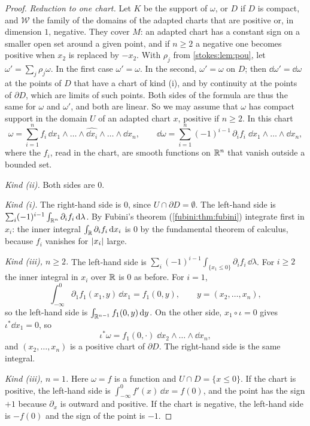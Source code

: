 \begin{notechapter}
\begin{proof}
\emph{Reduction to one chart.} Let $K$ be the support of $\omega$, or
$D$ if $D$ is compact, and $\mathcal W$ the family of the domains of
the adapted charts that are positive or, in dimension $1$, negative.
They cover $M$: an adapted chart has a constant sign on a smaller open
set around a given point, and if $n\geq2$ a negative one becomes
positive when $x_2$ is replaced by $-x_2$. With $\rho_j$ from
\cref{stokes:lem:pou}, let
$\omega' = \sum_j\rho_j\omega$. In the first case $\omega' = \omega$.
In the second, $\omega' = \omega$ on $D$; then
$\dd\omega' = \dd\omega$ at the points of $D$ that have a chart of kind
(i), and by continuity at the points of $\partial D$, which are limits
of such points. Both sides of the formula are thus the same for
$\omega$ and $\omega'$, and both are linear. So we may assume that
$\omega$ has compact support in the domain $U$ of an adapted chart
$x$, positive if $n\geq2$. In this chart
\[
  \omega = \sum_{i=1}^nf_i\,
  \dd x_1\wedge\dots\wedge\widehat{\dd x_i}\wedge\dots\wedge\dd x_n ,
  \qquad
  \dd\omega = \sum_{i=1}^n(-1)^{i-1}\,\partial_if_i\;
  \dd x_1\wedge\dots\wedge\dd x_n ,
\]
where the $f_i$, read in the chart, are smooth functions on $\mathbb{R}^n$ that
vanish outside a bounded set.

\emph{Kind (ii).} Both sides are $0$.

\emph{Kind (i).} The right-hand side is $0$, since
$U\cap\partial D = \emptyset$. The left-hand side is
$\sum_i(-1)^{i-1}\int_{\mathbb{R}^n}\partial_if_i\,\mathrm{d}\lambda$. By Fubini's
theorem (\cref{fubini:thm:fubini}) integrate first in $x_i$: the inner
integral $\int_{\mathbb{R}}\partial_if_i\,\mathrm{d} x_i$ is $0$ by the fundamental
theorem of calculus, because $f_i$ vanishes for $\left|x_i\right|$ large.

\emph{Kind (iii), $n\geq2$.} The left-hand side is
$\sum_i(-1)^{i-1}\int_{\{x_1\leq0\}}\partial_if_i\,\dd\lambda$. For
$i\geq2$ the inner integral in $x_i$ over $\mathbb{R}$ is $0$ as before. For
$i = 1$,
\[
  \int_{-\infty}^0\partial_1f_1(x_1, y)\,\dd x_1 = f_1(0, y) ,
  \qquad y = (x_2,\dots,x_n) ,
\]
so the left-hand side is $\int_{\mathbb{R}^{n-1}}f_1(0, y)\,\mathrm{d} y$. On the
other side, $x_1\circ\iota = 0$ gives $\iota^*\dd x_1 = 0$, so
\[
  \iota^*\omega = f_1(0, \cdot)\;\dd x_2\wedge\dots\wedge\dd x_n ,
\]
and $(x_2,\dots,x_n)$ is a positive chart of $\partial D$. The
right-hand side is the same integral.

\emph{Kind (iii), $n = 1$.} Here $\omega = f$ is a function and
$U\cap D = \{x\leq0\}$. If the chart is positive, the left-hand side is
$\int_{-\infty}^0f'(x)\,\dd x = f(0)$, and the point has the sign $+1$
because $\partial_x$ is outward and positive. If the chart is negative,
the left-hand side is $-f(0)$ and the sign of the point is $-1$.
\end{proof}


\end{notechapter}
